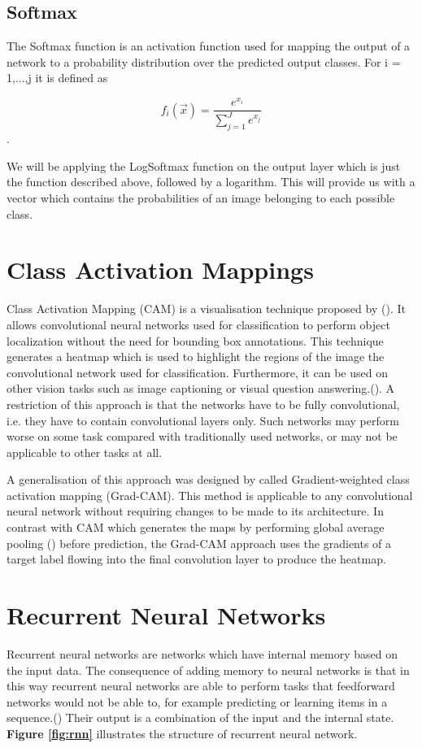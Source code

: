 \documentclass{l4proj}
\begin{document}
\subsection{Softmax}
The Softmax function is an activation function used for mapping the output of a network to a probability distribution over the predicted output classes. For i = 1,...,j it is defined as

\begin{equation}
    f_{i}({\vec {x}})={\frac {e^{x_{i}}}{\sum _{j=1}^{J}e^{x_{j}}}} 
\end{equation}.

We will be applying the LogSoftmax function on the output layer which is just the function described above, followed by a logarithm. This will provide us with a vector which contains the probabilities of an image belonging to each possible class.

\section{Class Activation Mappings}
Class Activation Mapping (CAM) is a visualisation technique proposed by (\cite{cam}). It allows convolutional neural networks used for classification to perform object localization without the need for bounding box annotations. This technique generates a heatmap which is used to highlight the regions of the image the convolutional network used for classification. Furthermore, it can be used on other vision tasks such as image captioning or visual question answering.(\cite{VQA}). A restriction of this approach is that the networks have to be fully convolutional, i.e. they have to contain convolutional layers only. Such networks may perform worse on some task compared with traditionally used networks, or may not be applicable to other tasks at all.

A generalisation of this approach was designed by \cite{gradcam} called Gradient-weighted class activation mapping (Grad-CAM). This method is applicable to any convolutional neural network without requiring changes to be made to its architecture. In contrast with CAM which generates the maps by performing global average pooling (\cite{gap}) before prediction, the Grad-CAM approach uses the gradients of a target label flowing into the final convolution layer to produce the heatmap.


\section{Recurrent Neural Networks}
Recurrent neural networks are networks which have internal memory based on the input data. The consequence of adding memory to neural networks is that in this way recurrent neural networks are able to perform tasks that feedforward networks would not be able to, for example predicting or learning items in a sequence.(\cite{recurrent}) Their output is a combination of the input and the internal state.
\textbf{Figure \ref{fig:rnn}} illustrates the structure of recurrent neural network.
\end{document}

